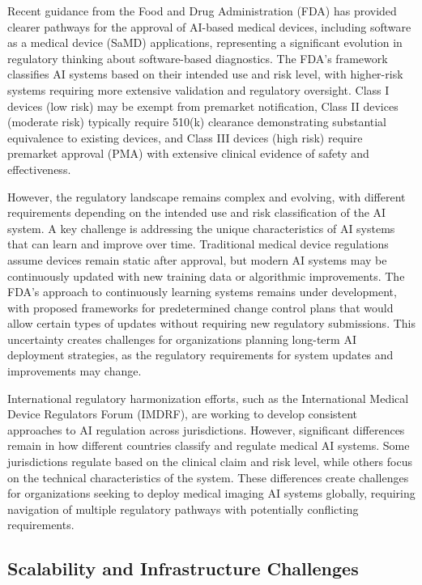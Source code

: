 \documentclass[12pt,a4paper]{article}
\begin{document}
Recent guidance from the Food and Drug Administration (FDA) \cite{fda2021ai} has provided clearer pathways for the approval of AI-based medical devices, including software as a medical device (SaMD) applications, representing a significant evolution in regulatory thinking about software-based diagnostics. The FDA's framework classifies AI systems based on their intended use and risk level, with higher-risk systems requiring more extensive validation and regulatory oversight. Class I devices (low risk) may be exempt from premarket notification, Class II devices (moderate risk) typically require 510(k) clearance demonstrating substantial equivalence to existing devices, and Class III devices (high risk) require premarket approval (PMA) with extensive clinical evidence of safety and effectiveness.

However, the regulatory landscape remains complex and evolving, with different requirements depending on the intended use and risk classification of the AI system. A key challenge is addressing the unique characteristics of AI systems that can learn and improve over time. Traditional medical device regulations assume devices remain static after approval, but modern AI systems may be continuously updated with new training data or algorithmic improvements. The FDA's approach to continuously learning systems remains under development, with proposed frameworks for predetermined change control plans that would allow certain types of updates without requiring new regulatory submissions. This uncertainty creates challenges for organizations planning long-term AI deployment strategies, as the regulatory requirements for system updates and improvements may change.

International regulatory harmonization efforts, such as the International Medical Device Regulators Forum (IMDRF), are working to develop consistent approaches to AI regulation across jurisdictions. However, significant differences remain in how different countries classify and regulate medical AI systems. Some jurisdictions regulate based on the clinical claim and risk level, while others focus on the technical characteristics of the system. These differences create challenges for organizations seeking to deploy medical imaging AI systems globally, requiring navigation of multiple regulatory pathways with potentially conflicting requirements.

\subsection{Scalability and Infrastructure Challenges}
\end{document}
